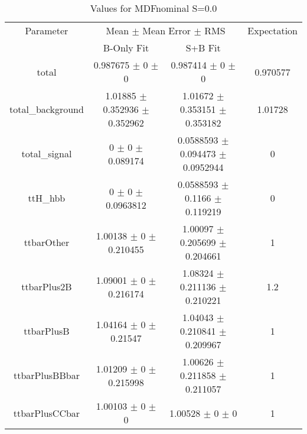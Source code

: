 \begin{table}
\centering
\caption{Values for MDFnominal S=0.0}
\begin{tabular}{cccc}
\toprule
Parameter & \multicolumn{2}{c}{Mean $\pm$ Mean Error $\pm$ RMS} & Expectation\\
 & B-Only Fit & S+B Fit & \\
\midrule
total & \num{0.987675} $\pm$ \num{0} $\pm$ \num{0} & \num{0.987414} $\pm$ \num{0} $\pm$ \num{0} & \num{0.970577}\\
total\_background & \num{1.01885} $\pm$ \num{0.352936} $\pm$ \num{0.352962} & \num{1.01672} $\pm$ \num{0.353151} $\pm$ \num{0.353182} & \num{1.01728}\\
total\_signal & \num{0} $\pm$ \num{0} $\pm$ \num{0.089174} & \num{0.0588593} $\pm$ \num{0.094473} $\pm$ \num{0.0952944} & \num{0}\\
ttH\_hbb & \num{0} $\pm$ \num{0} $\pm$ \num{0.0963812} & \num{0.0588593} $\pm$ \num{0.1166} $\pm$ \num{0.119219} & \num{0}\\
ttbarOther & \num{1.00138} $\pm$ \num{0} $\pm$ \num{0.210455} & \num{1.00097} $\pm$ \num{0.205699} $\pm$ \num{0.204661} & \num{1}\\
ttbarPlus2B & \num{1.09001} $\pm$ \num{0} $\pm$ \num{0.216174} & \num{1.08324} $\pm$ \num{0.211136} $\pm$ \num{0.210221} & \num{1.2}\\
ttbarPlusB & \num{1.04164} $\pm$ \num{0} $\pm$ \num{0.21547} & \num{1.04043} $\pm$ \num{0.210841} $\pm$ \num{0.209967} & \num{1}\\
ttbarPlusBBbar & \num{1.01209} $\pm$ \num{0} $\pm$ \num{0.215998} & \num{1.00626} $\pm$ \num{0.211858} $\pm$ \num{0.211057} & \num{1}\\
ttbarPlusCCbar & \num{1.00103} $\pm$ \num{0} $\pm$ \num{0} & \num{1.00528} $\pm$ \num{0} $\pm$ \num{0} & \num{1}\\
\bottomrule
\end{tabular}
\end{table}